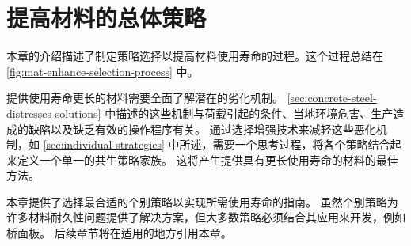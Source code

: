 \section{提高材料的总体策略}
\label{sec:overall-strategies}
本章的介绍描述了制定策略选择以提高材料使用寿命的过程。这个过程总结在\cref{fig:mat-enhance-selection-process} 中。

提供使用寿命更长的材料需要全面了解潜在的{劣化}机制。 \cref{sec:concrete-steel-distresses-solutions} 中描述的这些机制与荷载引起的条件、当地环境危害、生产造成的缺陷以及缺乏有效的操作程序有关。 通过选择增强技术来减轻这些恶化机制，如 \cref{sec:individual-strategies} 中所述，需要一个思考过程，将各个策略结合起来定义一个单一的共生策略家族。 这将产生提供具有更长使用寿命的材料的最佳方法。

本章提供了选择最合适的个别策略以实现所需使用寿命的指南。 虽然个别策略为许多材料耐久性问题提供了解决方案，但大多数策略必须结合其应用来开发，例如桥面板。 后续章节将在适用的地方引用本章。

